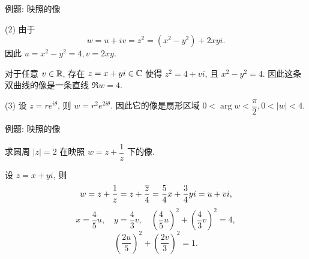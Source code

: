 \begin{frame}{例题: 映照的像}
\begin{solutionc}
(2) 由于
\[w=u+iv=z^2=(x^2-y^2)+2xyi.\]
\onslide<+->
因此 $u=x^2-y^2=4,v=2xy$.

\onslide<+->
\indent
对于任意 $v\in{\mathbb{R}}$, 存在 $z=x+yi\in{\mathbb{C}}$ 使得 $z^2=4+vi$, 且 $x^2-y^2=4$.
\onslide<+->
因此这条双曲线的像是一条直线 $\Re w=4$.

(3) 设 $z=re^{i\theta}$, 则 $w=r^2e^{2i\theta}$.
\onslide<+->
因此它的像是扇形区域 $0<\arg w<\dfrac\pi2,0<|w|<4$.
\vspace{-5pt}
\end{solutionc}
\end{frame}


\begin{frame}{例题: 映照的像}
\beqskip{7pt}
\begin{example}
求圆周 $|z|=2$ 在映照 $w=z+\dfrac1z$ 下的像.
\end{example}
\begin{solution}
设 $z=x+yi$, 则
\[w=z+\frac1z=z+\frac{\overline z}4=\frac54x+\frac34yi=u+vi,\]
\onslide<+->
\[x=\frac45u,\quad y=\frac43v,\quad \left(\frac45u\right)^2+\left(\frac43v\right)^2=4,\]
\onslide<+->
\[\left(\frac{2u}5\right)^2+\left(\frac{2v}3\right)^2=1.\]
\end{solution}
\endgroup
\end{frame}


